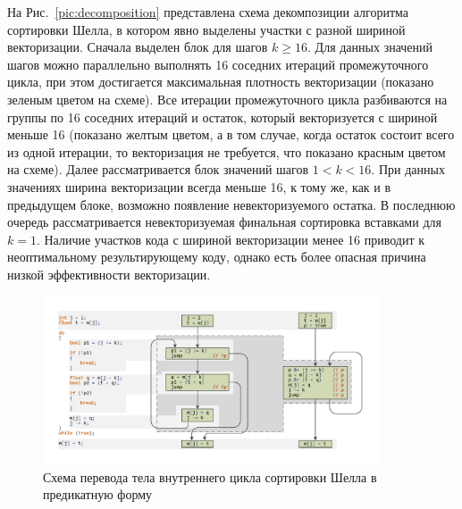 \documentclass[utf8]{psta}
\begin{document}
На Рис.~\ref{pic:decomposition} представлена схема декомпозиции алгоритма сортировки Шелла, в котором явно выделены участки с разной шириной векторизации. 
Сначала выделен блок для шагов $k \ge 16$. 
Для данных значений шагов можно параллельно выполнять 16 соседних итераций промежуточного цикла, при этом достигается максимальная плотность векторизации (показано зеленым цветом на схеме). 
Все итерации промежуточного цикла разбиваются на группы по 16 соседних итераций и остаток, который векторизуется с шириной меньше 16 (показано желтым цветом, а в том случае, когда остаток состоит всего из одной итерации, то векторизация не требуется, что показано красным цветом на схеме). Далее рассматривается блок значений шагов $1 < k < 16$. 
При данных значениях ширина векторизации всегда меньше 16, к тому же, как и в предыдущем блоке, возможно появление невекторизуемого остатка. 
В последнюю очередь рассматривается невекторизуемая финальная сортировка вставками для $k = 1$. 
Наличие участков кода с шириной векторизации менее 16 приводит к неоптимальному результирующему коду, однако есть более опасная причина низкой эффективности векторизации.

\begin{figure}
\includegraphics[width=10cm]{pics/pic_shell_cfg}
\caption{Схема перевода тела внутреннего цикла сортировки Шелла в предикатную форму}
\label{pic:shell_cfg}
\end{figure}
\end{document}
